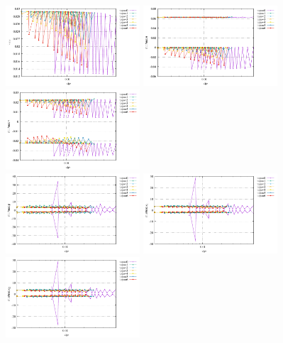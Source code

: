 \begin{center}
\includegraphics[width=5cm]{python_codes/fieldstone_78/results/vrms_exp11.pdf} 
\includegraphics[width=5cm]{python_codes/fieldstone_78/results/stats_u_exp11.pdf}
\includegraphics[width=5cm]{python_codes/fieldstone_78/results/stats_v_exp11.pdf}\\
\includegraphics[width=5cm]{python_codes/fieldstone_78/results/stats_p_exp11.pdf}
\includegraphics[width=5cm]{python_codes/fieldstone_78/results/stats_q1_exp11.pdf}
\includegraphics[width=5cm]{python_codes/fieldstone_78/results/stats_q2_exp11.pdf}
\end{center}







